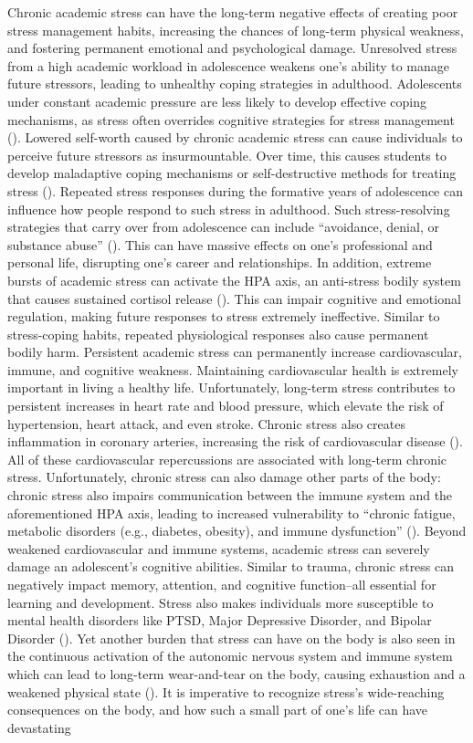 \documentclass[12pt, a4paper, twoside]{article}
\begin{document}
Chronic academic stress can have the long-term negative effects of creating poor stress management habits, increasing the chances of long-term physical weakness, and fostering permanent emotional and psychological damage. Unresolved stress from a high academic workload in adolescence weakens one’s ability to manage future stressors, leading to unhealthy coping strategies in adulthood. Adolescents under constant academic pressure are less likely to develop effective coping mechanisms, as stress often overrides cognitive strategies for stress management (\cite{chen2024}). Lowered self-worth caused by chronic academic stress can cause individuals to perceive future stressors as insurmountable. Over time, this causes students to develop maladaptive coping mechanisms or self-destructive methods for treating stress (\cite{cordovaolivera2023}). Repeated stress responses during the formative years of adolescence can influence how people respond to such stress in adulthood. Such stress-resolving strategies that carry over from adolescence can include “avoidance, denial, or substance abuse” (\cite{claney2023}). This can have massive effects on one’s professional and personal life, disrupting one’s career and relationships. In addition, extreme bursts of academic stress can activate the HPA axis, an anti-stress bodily system that causes sustained cortisol release (\cite{cordovaolivera2023}). This can impair cognitive and emotional regulation, making future responses to stress extremely ineffective. Similar to stress-coping habits, repeated physiological responses also cause permanent bodily harm. Persistent academic stress can permanently increase cardiovascular, immune, and cognitive weakness. Maintaining cardiovascular health is extremely important in living a healthy life. Unfortunately, long-term stress contributes to persistent increases in heart rate and blood pressure, which elevate the risk of hypertension, heart attack, and even stroke. Chronic stress also creates inflammation in coronary arteries, increasing the risk of cardiovascular disease (\cite{almroth2019}). All of these cardiovascular repercussions are associated with long-term chronic stress. Unfortunately, chronic stress can also damage other parts of the body: chronic stress also impairs communication between the immune system and the aforementioned HPA axis, leading to increased vulnerability to “chronic fatigue, metabolic disorders (e.g., diabetes, obesity), and immune dysfunction” (\cite{sha2023}). Beyond weakened cardiovascular and immune systems, academic stress can severely damage an adolescent’s cognitive abilities. Similar to trauma, chronic stress can negatively impact memory, attention, and cognitive function–all essential for learning and development. Stress also makes individuals more susceptible to mental health disorders like PTSD, Major Depressive Disorder, and Bipolar Disorder (\cite{claney2023}). Yet another burden that stress can have on the body is also seen in the continuous activation of the autonomic nervous system and immune system which can lead to long-term wear-and-tear on the body, causing exhaustion and a weakened physical state (\cite{almroth2019}). It is imperative to recognize stress’s wide-reaching consequences on the body, and how such a small part of one’s life can have devastating 
\end{document}
